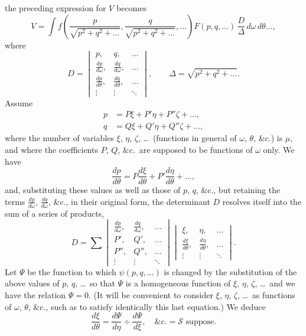\documentclass[11pt,a4paper]{book}
\begin{document}
the preceding expression for $V$ becomes
\[
V = \int f\left(\frac{p}{\sqrt{p^{2} + q^{2} + \ldots}}, \frac{q}{\sqrt{p^{2} + q^{2} + \ldots}}, \ldots\right) F(p, q, \ldots)\, \frac{D}{\Delta}\, d\omega\, d\theta\ldots,
\]
where
\[
D = \begin{vmatrix}
p, & q, & \ldots \\
\frac{dp}{d\omega}, & \frac{dq}{d\omega}, & \ldots \\
\frac{dp}{d\theta}, & \frac{dq}{d\theta}, & \ldots \\
\vdots & \vdots & \ddots
\end{vmatrix}, \qquad
\Delta = \sqrt{p^{2} + q^{2} + \ldots}.
\]
Assume
\begin{align*}
p &= P\xi + P'\eta + P''\zeta + \ldots, \\
q &= Q\xi + Q'\eta + Q''\zeta + \ldots,
\end{align*}
where the number of variables $\xi$, $\eta$, $\zeta$, \ldots\ (functions in general of $\omega$, $\theta$, \&c.) is $\mu$, and where the coefficients $P$, $Q$, \&c.\ are supposed to be functions of $\omega$ only. We have
\[
\frac{dp}{d\theta} = P\frac{d\xi}{d\theta} + P'\frac{d\eta}{d\theta} + \ldots,
\]
and, substituting these values as well as those of $p$, $q$, \&c., but retaining the terms $\frac{dp}{d\omega}$, $\frac{dq}{d\omega}$, \&c., in their original form, the determinant $D$ resolves itself into the sum of a series of products,
\[
D = \sum \begin{vmatrix}
\frac{dp}{d\omega}, & \frac{dq}{d\omega}, & \ldots \\
P', & Q', & \ldots \\
P'', & Q'', & \ldots \\
\vdots & \vdots & \ddots
\end{vmatrix}
\begin{vmatrix}
\xi, & \eta, & \ldots \\
\frac{d\xi}{d\theta}, & \frac{d\eta}{d\theta}, & \ldots \\
\vdots & \vdots & \ddots
\end{vmatrix}.
\]
Let $\Psi$ be the function to which $\psi(p, q, \ldots)$ is changed by the substitution of the above values of $p$, $q$, \ldots\ so that $\Psi$ is a homogeneous function of $\xi$, $\eta$, $\zeta$, \ldots\ and we have the relation $\Psi = 0$. (It will be convenient to consider $\xi$, $\eta$, $\zeta$, \ldots\ as functions of $\omega$, $\theta$, \&c., such as to satisfy identically this last equation.) We deduce
\[
\frac{d\xi}{d\theta} = \frac{d\Psi}{d\eta} \div \frac{d\Psi}{d\xi}, \quad \&\text{c.} = \mathcal{S} \text{ suppose}.
\]
\end{document}
